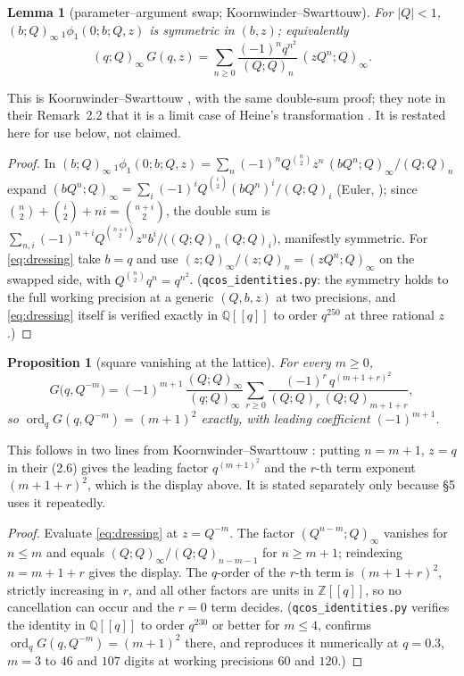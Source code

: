 \documentclass[11pt]{article}
\theoremstyle{plain}
\newtheorem{lemma}[theorem]{Lemma}
\newtheorem{proposition}[theorem]{Proposition}
\theoremstyle{definition}
\theoremstyle{remark}
\newcommand{\Z}{\mathbb{Z}}
\newcommand{\Q}{\mathbb{Q}}
\DeclareMathOperator{\ord}{ord}
\begin{document}
\begin{lemma}[parameter--argument swap; Koornwinder--Swarttouw]\label{lem:swap}
For $|Q|<1$,
$(b;Q)_\infty\,{}_1\phi_1(0;b;Q,z)$ is symmetric in $(b,z)$; equivalently
\begin{equation}\label{eq:dressing}
   (q;Q)_\infty\,G(q,z)=\sum_{n\ge0}\frac{(-1)^nq^{n^2}}{(Q;Q)_n}\,(zQ^n;Q)_\infty .
\end{equation}
\end{lemma}

\noindent This is Koornwinder--Swarttouw \cite[Prop.~2.1, eq.~(2.3)]{KS1992}, with the same double-sum
proof; they note in their Remark~2.2 that it is a limit case of Heine's transformation
\cite[\S1.4]{GR}. It is restated
here for use below, not claimed.

\begin{proof}
In $(b;Q)_\infty\,{}_1\phi_1(0;b;Q,z)=\sum_n(-1)^nQ^{\binom n2}z^n\,(bQ^n;Q)_\infty/(Q;Q)_n$
expand $(bQ^n;Q)_\infty=\sum_i(-1)^iQ^{\binom i2}(bQ^n)^i/(Q;Q)_i$ (Euler, \cite[(1.3.16)]{GR});
since
$\binom n2+\binom i2+ni=\binom{n+i}2$, the double sum is
$\sum_{n,i}(-1)^{n+i}Q^{\binom{n+i}2}z^nb^i/\bigl((Q;Q)_n(Q;Q)_i\bigr)$, manifestly symmetric.
For \eqref{eq:dressing} take $b=q$ and use $(z;Q)_\infty/(z;Q)_n=(zQ^n;Q)_\infty$ on the swapped
side, with $Q^{\binom n2}q^n=q^{n^2}$. (\texttt{qcos\_identities.py}: the symmetry holds to
the full working precision at a generic $(Q,b,z)$ at two precisions, and \eqref{eq:dressing}
itself is verified exactly in $\Q[[q]]$ to order $q^{250}$ at three rational $z$.)
\end{proof}

\begin{proposition}[square vanishing at the lattice]\label{prop:latticevalues}
For every $m\ge0$,
\[
   G\bigl(q,Q^{-m}\bigr)
   =(-1)^{m+1}\,\frac{(Q;Q)_\infty}{(q;Q)_\infty}
    \sum_{r\ge0}\frac{(-1)^r\,q^{(m+1+r)^2}}{(Q;Q)_r\,(Q;Q)_{m+1+r}} ,
\]
so $\operatorname{ord}_qG(q,Q^{-m})=(m+1)^2$ exactly, with leading coefficient $(-1)^{m+1}$.
\end{proposition}

\noindent This follows in two lines from Koornwinder--Swarttouw \cite[Prop.~2.1 and Rem.~2.3,
eq.~(2.6)]{KS1992}: putting $n=m+1$, $z=q$ in their (2.6) gives the leading factor $q^{(m+1)^2}$ and
the $r$-th term exponent $(m+1+r)^2$, which is the display above. It is stated separately only
because \S5 uses it repeatedly.

\begin{proof}
Evaluate \eqref{eq:dressing} at $z=Q^{-m}$. The factor $(Q^{n-m};Q)_\infty$ vanishes for $n\le m$
and equals $(Q;Q)_\infty/(Q;Q)_{n-m-1}$ for $n\ge m+1$; reindexing $n=m+1+r$ gives the display.
The $q$-order of the $r$-th term is $(m+1+r)^2$, strictly increasing in $r$, and all other factors
are units in $\Z[[q]]$, so no cancellation can occur and the $r=0$ term decides.
(\texttt{qcos\_identities.py} verifies the identity in $\Q[[q]]$ to order $q^{230}$ or better
for $m\le4$, confirms $\ord_qG(q,Q^{-m})=(m+1)^2$ there, and reproduces it numerically at $q=0.3$,
$m=3$ to $46$ and $107$ digits at working precisions $60$ and $120$.)
\end{proof}
\end{document}

